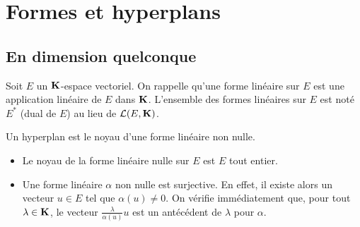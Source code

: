 \section{Formes et hyperplans}
\subsection{En dimension quelconque}
Soit $E$ un $\mathbf{K}$-espace vectoriel. On rappelle qu'une forme linéaire sur $E$ est une application linéaire de $E$ dans $\mathbf{K}$. L'ensemble des formes linéaires sur $E$ est noté $E^*$ (dual de $E$) au lieu de $\mathcal{L}(E,\mathbf{K})$.
\begin{defi}[hyperplan]
Un hyperplan est le noyau d'une forme linéaire non nulle.  
\end{defi}
\begin{rems}
\begin{itemize}
  \item Le noyau de la forme linéaire nulle sur $E$ est $E$ tout entier.
  \item Une forme linéaire $\alpha$ non nulle est surjective. En effet, il existe alors un vecteur $u\in E$ tel que $\alpha(u)\neq 0$. On vérifie immédiatement que, pour tout $\lambda \in \mathbf{K}$, le vecteur $\frac{\lambda}{\alpha(u)}u$ est un antécédent de $\lambda$ pour $\alpha$.
\end{itemize}
\end{rems}

